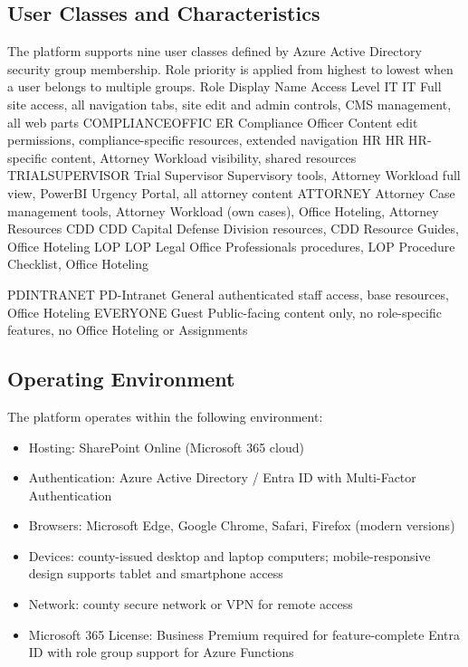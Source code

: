 \documentclass[12pt]{article}
\begin{document}
\subsection{User Classes and Characteristics}

The platform supports nine user classes defined by Azure Active Directory security group membership. Role priority is applied from highest to lowest when a user belongs to multiple groups. Role Display Name Access Level IT IT Full site access, all navigation tabs, site edit and admin controls, CMS management, all web parts COMPLIANCEOFFIC ER Compliance Officer Content edit permissions, compliance-specific resources, extended navigation HR HR HR-specific content, Attorney Workload visibility, shared resources TRIALSUPERVISOR Trial Supervisor Supervisory tools, Attorney Workload full view, PowerBI Urgency Portal, all attorney content ATTORNEY Attorney Case management tools, Attorney Workload (own cases), Office Hoteling, Attorney Resources CDD CDD Capital Defense Division resources, CDD Resource Guides, Office Hoteling LOP LOP Legal Office Professionals procedures, LOP Procedure Checklist, Office Hoteling

PDINTRANET PD-Intranet General authenticated staff access, base resources, Office Hoteling EVERYONE Guest Public-facing content only, no role-specific features, no Office Hoteling or Assignments

\subsection{Operating Environment}

The platform operates within the following environment:

\begin{itemize}[leftmargin=*]
\item  Hosting: SharePoint Online (Microsoft 365 cloud)
\item  Authentication: Azure Active Directory / Entra ID with Multi-Factor Authentication
\item  Browsers: Microsoft Edge, Google Chrome, Safari, Firefox (modern versions)
\item  Devices: county-issued desktop and laptop computers; mobile-responsive design supports tablet and smartphone access
\item  Network: county secure network or VPN for remote access
\item  Microsoft 365 License: Business Premium required for feature-complete Entra ID with role group support for Azure Functions
\end{itemize}
\end{document}
